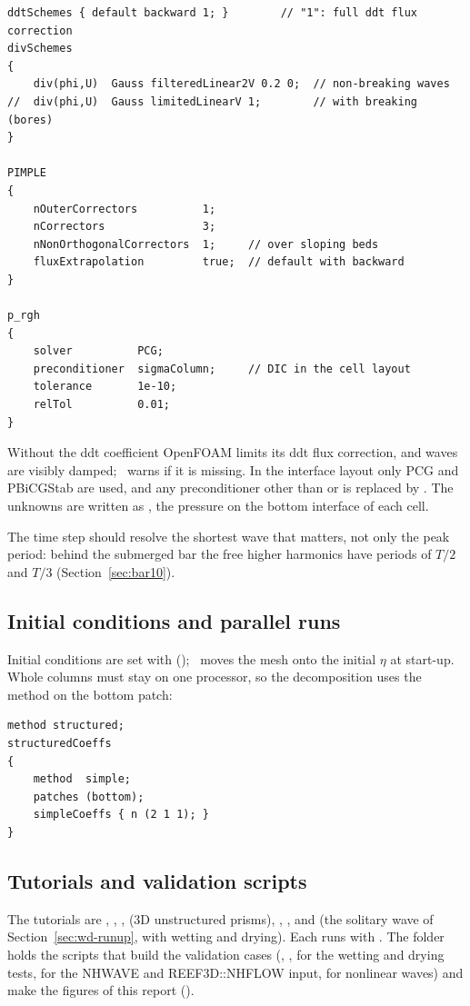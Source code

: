 \begin{verbatim}
ddtSchemes { default backward 1; }        // "1": full ddt flux correction
divSchemes
{
    div(phi,U)  Gauss filteredLinear2V 0.2 0;  // non-breaking waves
//  div(phi,U)  Gauss limitedLinearV 1;        // with breaking (bores)
}

PIMPLE
{
    nOuterCorrectors          1;
    nCorrectors               3;
    nNonOrthogonalCorrectors  1;     // over sloping beds
    fluxExtrapolation         true;  // default with backward
}

p_rgh
{
    solver          PCG;
    preconditioner  sigmaColumn;     // DIC in the cell layout
    tolerance       1e-10;
    relTol          0.01;
}
\end{verbatim}

Without the ddt coefficient OpenFOAM limits its ddt flux correction, and waves
are visibly damped; \NHFOAM\ warns if it is missing. In the interface layout
only PCG and PBiCGStab are used, and any preconditioner other than
 or  is replaced by . The unknowns
are written as , the pressure on the bottom interface of each cell.

The time step should resolve the shortest wave that matters, not only the
peak period: behind the submerged bar the free higher harmonics have periods
of $T/2$ and $T/3$ (Section~\ref{sec:bar10}).

\subsection{Initial conditions and parallel runs}

Initial conditions are set with 
(); \NHFOAM\ moves the mesh onto the initial
$\eta$ at start-up. Whole columns must stay on one processor, so the
decomposition uses the  method on the bottom patch:
\begin{verbatim}
method structured;
structuredCoeffs
{
    method  simple;
    patches (bottom);
    simpleCoeffs { n (2 1 1); }
}
\end{verbatim}

\subsection{Tutorials and validation scripts}

The tutorials are , ,
,  (3D unstructured prisms),
, ,  and
 (the solitary wave of Section~\ref{sec:wd-runup}, with
wetting and drying). Each runs with . The folder
 holds the scripts that build the validation cases
(, ,  for the wetting and
drying tests,  for the NHWAVE and REEF3D::NHFLOW input,
 for nonlinear waves) and make the figures of this
report ().
